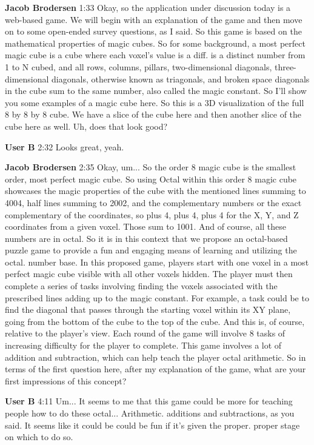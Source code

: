 \documentclass{article}
\begin{document}
\noindent \textbf{Jacob Brodersen}   1:33
Okay, so the application under discussion today is a web-based game. We will begin with an explanation of the game and then move on to some open-ended survey questions, as I said. So this game is based on the mathematical properties of magic cubes. So for some background, a most perfect magic cube is a cube where each voxel's value is a diff.
is a distinct number from 1 to N cubed, and all rows, columns, pillars, two-dimensional diagonals, three-dimensional diagonals, otherwise known as triagonals, and broken space diagonals in the cube sum to the same number, also called the magic constant. So I'll show you some examples of
a magic cube here. So this is a 3D visualization of the full 8 by 8 by 8 cube. We have a slice of the cube here and then another slice of the cube here as well.
Uh, does that look good?

\noindent \textbf{User B}   2:32
Looks great, yeah.

\noindent \textbf{Jacob Brodersen}   2:35
Okay, um...
So the order 8 magic cube is the smallest order, most perfect magic cube. So using Octal within this order 8 magic cube showcases the magic properties of the cube with the mentioned lines summing to 4004, half lines summing to 2002, and the complementary numbers or the exact
complementary of the coordinates, so plus 4, plus 4, plus 4 for the X, Y, and Z coordinates from a given voxel. Those sum to 1001. And of course, all these numbers are in octal. So it is in this context that we propose an octal-based puzzle game to provide a fun and engaging means of learning and utilizing the octal.
number base. In this proposed game, players start with one voxel in a most perfect magic cube visible with all other voxels hidden. The player must then complete a series of tasks involving finding the voxels associated with the prescribed lines adding up to the magic constant. For example, a task could be to find the diagonal that passes through the starting voxel within its XY plane,
going from the bottom of the cube to the top of the cube. And this is, of course, relative to the player's view.
Each round of the game will involve 8 tasks of increasing difficulty for the player to complete. This game involves a lot of addition and subtraction, which can help teach the player octal arithmetic.
So in terms of the first question here, after my explanation of the game, what are your first impressions of this concept?

\noindent \textbf{User B}   4:11
Um...
It seems to me that this game could be more for teaching people how to do these octal...
Arithmetic.
additions and subtractions, as you said. It seems like it could be could be fun if it's given the proper.
proper stage on which to do so.
\end{document}
